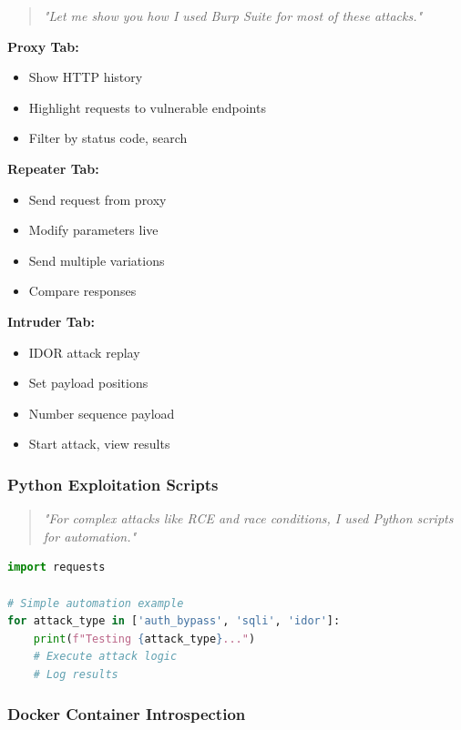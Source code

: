 \documentclass[12pt,a4paper]{article}
\begin{document}
\begin{quote}
\textit{"Let me show you how I used Burp Suite for most of these attacks."}
\end{quote}

\textbf{Proxy Tab:}
\begin{itemize}
    \item Show HTTP history
    \item Highlight requests to vulnerable endpoints
    \item Filter by status code, search
\end{itemize}

\textbf{Repeater Tab:}
\begin{itemize}
    \item Send request from proxy
    \item Modify parameters live
    \item Send multiple variations
    \item Compare responses
\end{itemize}

\textbf{Intruder Tab:}
\begin{itemize}
    \item IDOR attack replay
    \item Set payload positions
    \item Number sequence payload
    \item Start attack, view results
\end{itemize}

\subsubsection{Python Exploitation Scripts}

\begin{quote}
\textit{"For complex attacks like RCE and race conditions, I used Python scripts for automation."}
\end{quote}

\begin{lstlisting}[language=Python]
import requests

# Simple automation example
for attack_type in ['auth_bypass', 'sqli', 'idor']:
    print(f"Testing {attack_type}...")
    # Execute attack logic
    # Log results
\end{lstlisting}

\subsubsection{Docker Container Introspection}
\end{document}
